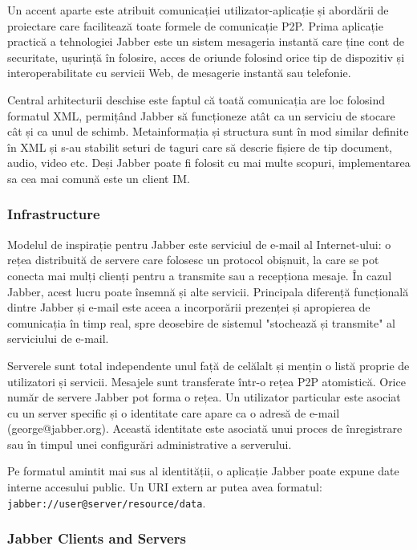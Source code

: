 Un accent aparte este atribuit comunicației utilizator-aplicație și abordării
de proiectare care facilitează toate formele de comunicație P2P. Prima
aplicație practică a tehnologiei Jabber este un sistem mesageria instantă care
ține cont de securitate, ușurință în folosire, acces de oriunde folosind orice
tip de dispozitiv și interoperabilitate cu servicii Web, de mesagerie instantă
sau telefonie.

Central arhitecturii deschise este faptul că toată comunicația are loc
folosind formatul XML, permițând Jabber să funcționeze atât ca un serviciu de
stocare cât și ca unul de schimb. Metainformația și structura sunt în mod
similar definite în XML și s-au stabilit seturi de taguri care să descrie
fișiere de tip document, audio, video etc. Deși Jabber poate fi folosit cu mai
multe scopuri, implementarea sa cea mai comună este un client IM.

\subsubsection{Infrastructure}

Modelul de inspirație pentru Jabber este serviciul de e-mail al Internet-ului:
o rețea distribuită de servere care folosesc un protocol obișnuit, la care se
pot conecta mai mulți clienți pentru a transmite sau a recepționa mesaje. În
cazul Jabber, acest lucru poate însemnă și alte servicii. Principala diferență
funcțională dintre Jabber și e-mail este aceea a incorporării prezenței și
apropierea de comunicația în timp real, spre deosebire de sistemul "stochează
și transmite" al serviciului de e-mail.

Serverele sunt total independente unul față de celălalt și mențin o listă
proprie de utilizatori și servicii. Mesajele sunt transferate într-o rețea P2P
atomistică. Orice număr de servere Jabber pot forma o rețea. Un utilizator
particular este asociat cu un server specific și o identitate care apare ca o
adresă de e-mail (george@jabber.org).  Această identitate este asociată unui
proces de înregistrare sau în timpul unei configurări administrative a
serverului.

Pe formatul amintit mai sus al identității, o aplicație Jabber poate expune
date interne accesului public. Un URI extern ar putea avea formatul:
\texttt{jabber://user@server/resource/data}.

\subsubsection{Jabber Clients and Servers}

